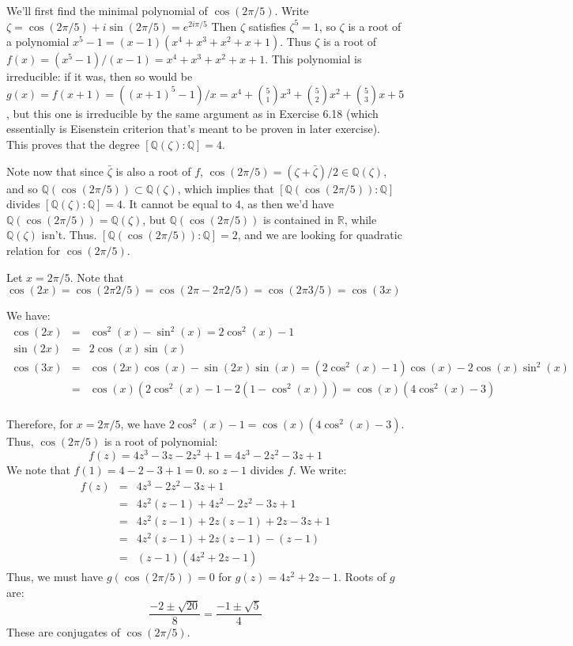 \documentclass[notitlepage]{article}
\theoremstyle{definition}
\newcommand\Q{\mathbb{Q}}
\newcommand\R{\mathbb{R}}
\begin{document}
We'll first find the minimal polynomial of $\cos(2 \pi /5)$. Write
$\zeta = \cos(2 \pi/5) + i \sin(2 \pi/5) = e^{2 i \pi/5}$ Then $\zeta$
satisfies $\zeta^5 = 1$, so $\zeta$ is a root of a polynomial $x^5 - 1
= (x-1)(x^4 + x^3 + x^2 + x + 1)$. Thus $\zeta$ is a root of $f(x) =
(x^5-1)/(x-1) = x^4 + x^3 + x^2 + x + 1$. This polynomial is
irreducible: if it was, then so would be $g(x) = f(x+1) = ((x+1)^5 -
1)/x = x^4 + {5 \choose 1} x^3 + {5 \choose 2} x^2 + {5 \choose 3} x +
5$, but this one is irreducible by the same argument as in Exercise
6.18 (which essentially is Eisenstein criterion that's meant to be
proven in later exercise). This proves that the degree $[\Q(\zeta):\Q]
= 4$.

Note now that since $\bar{\zeta}$ is also a root of $f$, $\cos(2 \pi/
5) = (\zeta+\bar{\zeta})/2 \in \Q(\zeta)$, and so $\Q(\cos(2\pi/5))
\subset \Q(\zeta)$, which implies that $[\Q(\cos(2\pi/5)) : \Q]$
divides $[\Q(\zeta):\Q] = 4$. It cannot be equal to $4$, as then we'd
have $\Q(\cos(2\pi/5)) = \Q(\zeta)$, but $\Q(\cos(2\pi/5))$ is
contained in $\R$, while $\Q(\zeta)$ isn't. Thus. $[\Q(\cos(2\pi/5))
  : \Q] = 2$, and we are looking for quadratic relation for $\cos(2
\pi/5)$.

Let $x = 2 \pi/5$. Note that $\cos(2x) = \cos(2\pi 2/5) = \cos(2\pi -
2 \pi 2/5) = \cos (2 \pi 3/5) = \cos(3x)$

We have:
\begin{eqnarray}
  \cos(2x) &=& \cos^2(x) - \sin^2(x) = 2 \cos^2(x) - 1 \\
  \sin(2x) &=& 2 \cos(x) \sin(x) \\
  \cos(3x) &=& \cos(2x)\cos(x) - \sin(2x)\sin(x) = (2 \cos^2(x) - 1)\cos(x) - 2 \cos(x) \sin^2(x) \\
  &=& \cos(x)(2 \cos^2(x) - 1 - 2(1 - \cos^2(x))) = \cos(x)(4 \cos^2(x) -3) \\
\end{eqnarray}

Therefore, for $x = 2\pi/5$, we have $2 \cos^2(x) - 1 = \cos(x)(4
\cos^2(x) -3)$. Thus, $\cos(2\pi/5)$ is a root of polynomial:
\begin{equation}
  f(z) = 4z^3 - 3z - 2 z^2 + 1 = 4z^3 - 2z^2 - 3z + 1
\end{equation}
We note that $f(1) = 4 - 2 - 3 + 1 = 0$. so $z-1$ divides $f$. We write:
\begin{eqnarray}
  f(z) &=& 4z^3 - 2z^2 - 3z + 1 \\
  &=& 4z^2(z-1) + 4z^2 - 2z^2 - 3z + 1 \\
  &=& 4z^2(z-1) + 2z(z-1) + 2z - 3z + 1 \\
  &=& 4z^2(z-1) + 2z(z-1) - (z-1) \\
  &=& (z-1)(4z^2 +2z -1)
\end{eqnarray}
Thus, we must have $g(\cos(2\pi/5)) = 0$ for $g(z) = 4z^2 +2z -1$. Roots of $g$ are:
\begin{equation}
  \frac{-2\pm\sqrt{20}}{8} = \frac{-1\pm\sqrt{5}}{4}
\end{equation}
These are conjugates of $\cos(2\pi/5)$.
\end{document}
